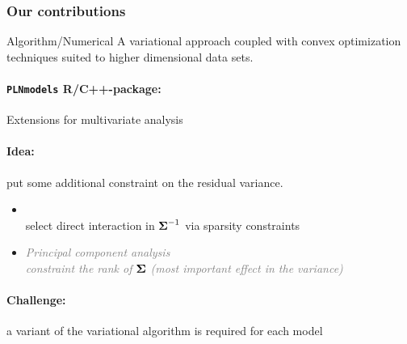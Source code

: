 \documentclass[10pt, c, xcolor=x11names]{beamer}\usepackage[]{graphicx}\usepackage[]{color}
\begin{document}
\begin{frame}
  \frametitle{Our contributions}

  \begin{block}{Algorithm/Numerical}
    A variational approach coupled with convex optimization techniques suited to higher dimensional data sets.
    
    \paragraph{{\tt PLNmodels} R/C++-package:}  
  \end{block}
  
  \vfill
  
  \begin{block}{Extensions for multivariate analysis}
     \paragraph{Idea:} put some additional constraint on the residual variance.
      \begin{itemize}
      \item {} \\
        \rsa select direct interaction in $\boldsymbol{\Sigma}^{-1}$ via sparsity constraints
        
      \item \textcolor{gray}{\it Principal component analysis}\\
        \textcolor{gray}{\it constraint the rank of $\boldsymbol{\Sigma}$ (most important effect in the variance)}

    \end{itemize}

    \paragraph{Challenge:} a variant of the variational algorithm is required for each model
  \end{block}


\end{frame}
\end{document}

